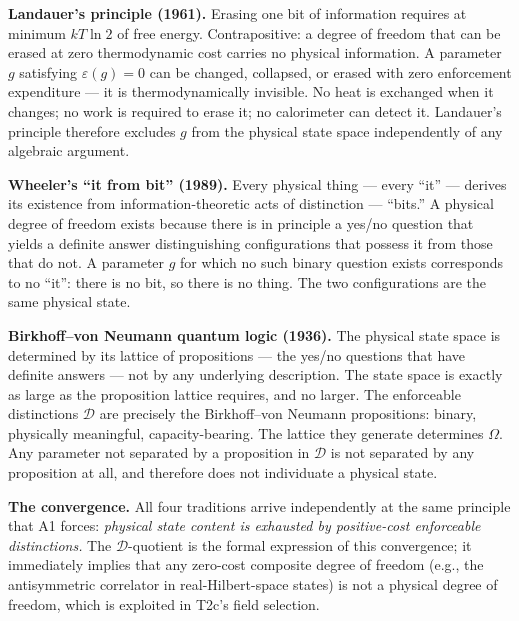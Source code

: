 \documentclass[11pt]{article}
\theoremstyle{remark}
\begin{document}
\medskip\noindent\textbf{Landauer's principle (1961).}  Erasing one bit of information requires at minimum $kT\ln 2$ of free energy.  Contrapositive: a degree of freedom that can be erased at zero thermodynamic cost carries no physical information.  A parameter $g$ satisfying $\varepsilon(g) = 0$ can be changed, collapsed, or erased with zero enforcement expenditure --- it is thermodynamically invisible.  No heat is exchanged when it changes; no work is required to erase it; no calorimeter can detect it.  Landauer's principle therefore excludes $g$ from the physical state space independently of any algebraic argument.

\medskip\noindent\textbf{Wheeler's ``it from bit'' (1989).}  Every physical thing --- every ``it'' --- derives its existence from information-theoretic acts of distinction --- ``bits.''  A physical degree of freedom exists because there is in principle a yes/no question that yields a definite answer distinguishing configurations that possess it from those that do not.  A parameter $g$ for which no such binary question exists corresponds to no ``it'': there is no bit, so there is no thing.  The two configurations are the same physical state.

\medskip\noindent\textbf{Birkhoff--von Neumann quantum logic (1936).}  The physical state space is determined by its lattice of propositions --- the yes/no questions that have definite answers --- not by any underlying description.  The state space is exactly as large as the proposition lattice requires, and no larger.  The enforceable distinctions $\mathcal{D}$ are precisely the Birkhoff--von Neumann propositions: binary, physically meaningful, capacity-bearing.  The lattice they generate determines $\Omega$.  Any parameter not separated by a proposition in $\mathcal{D}$ is not separated by any proposition at all, and therefore does not individuate a physical state.

\medskip\noindent\textbf{The convergence.}  All four traditions arrive independently at the same principle that A1 forces: \emph{physical state content is exhausted by positive-cost enforceable distinctions.}  The $\mathcal{D}$-quotient is the formal expression of this convergence; it immediately implies that any zero-cost composite degree of freedom (e.g., the antisymmetric correlator in real-Hilbert-space states) is not a physical degree of freedom, which is exploited in T2c's field selection.


\medskip
\end{document}
